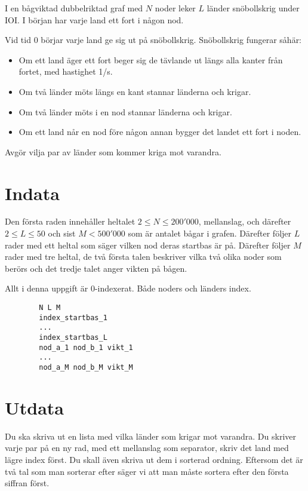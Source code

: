 
I en bågviktad dubbelriktad graf med $N$ noder leker $L$ länder snöbollskrig under IOI. I
början har varje land ett fort i någon nod.

Vid tid $0$ börjar varje land ge sig ut på snöbollskrig. Snöbollskrig fungerar såhär:

\begin{itemize}
\item Om ett land äger ett fort beger sig de tävlande ut längs alla kanter från fortet, med hastighet 1/s.
\item Om två länder möts längs en kant stannar länderna och krigar.
\item Om två länder möts i en nod stannar länderna och krigar.
\item Om ett land når en nod före någon annan bygger det landet ett fort i noden.
\end{itemize}

Avgör vilja par av länder som kommer kriga mot varandra.

\section*{Indata}

Den första raden innehåller heltalet $2 \le N \le 200'000$, mellanslag, och
därefter $2 \le L \le 50$ och sist $M < 500'000$ som är antalet bågar i
grafen. Därefter följer $L$ rader med ett heltal som säger vilken nod deras
startbas är på. Därefter följer $M$ rader med tre heltal, de två första talen
beskriver vilka två olika noder som berörs och det tredje talet anger vikten på
bågen.

Allt i denna uppgift är 0-indexerat. Både noders och länders index.

\begin{lstlisting}
        N L M
        index_startbas_1
        ...
        index_startbas_L
        nod_a_1 nod_b_1 vikt_1
        ...
        nod_a_M nod_b_M vikt_M
\end{lstlisting}

\section*{Utdata}

Du ska skriva ut en lista med vilka länder som krigar mot varandra. Du skriver
varje par på en ny rad, med ett mellanslag som separator, skriv det land med
lägre index först. Du skall även skriva ut dem i sorterad ordning. Eftersom det
är två tal som man sorterar efter säger vi att man måste sortera efter den
första siffran först. 

